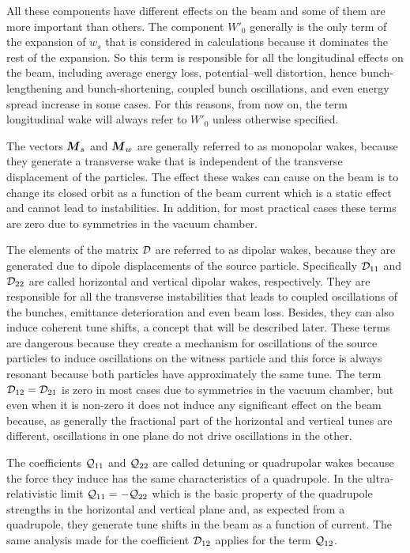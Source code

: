     All these components have different effects on the beam and some of them are more important than others. The component $W'_0$ generally is the only term of the expansion of $w_s$ that is considered in calculations because it dominates the rest of the expansion. So this term is responsible for all the longitudinal effects on the beam, including average energy loss, potential--well distortion, hence bunch-lengthening and bunch-shortening, coupled bunch oscillations, and even energy spread increase in some cases. For this reasons, from now on, the term longitudinal wake will always refer to $W'_0$ unless otherwise specified.

    The vectors $\boldsymbol{M}_s$ and $\boldsymbol{M}_w$ are generally referred to as monopolar wakes, because they generate a transverse wake that is independent of the transverse displacement of the particles. The effect these wakes can cause on the beam is to change its closed orbit as a function of the beam current which is a static effect and cannot lead to instabilities. In addition, for most practical cases these terms are zero due to symmetries in the vacuum chamber.

    The elements of the matrix $\mathcal{D}$ are referred to as dipolar wakes, because they are generated due to dipole displacements of the source particle. Specifically $\mathcal{D}_{11}$ and $\mathcal{D}_{22}$ are called horizontal and vertical dipolar wakes, respectively. They are responsible for all the transverse instabilities that leads to coupled oscillations of the bunches, emittance deterioration and even beam loss. Besides, they can also induce coherent tune shifts, a concept that will be described later. These terms are dangerous because they create a mechanism for oscillations of the source particles to induce oscillations on the witness particle and this force is always resonant because both particles have approximately the same tune. The term $\mathcal{D}_{12}=\mathcal{D}_{21}$ is zero in most cases due to symmetries in the vacuum chamber, but even when it is non-zero it does not induce any significant effect on the beam because, as generally the fractional part of the horizontal and vertical tunes are different, oscillations in one plane do not drive oscillations in the other.

    The coefficients $\mathcal{Q}_{11}$ and $\mathcal{Q}_{22}$ are called detuning or quadrupolar wakes because the force they induce has the same characteristics of a quadrupole. In the ultra-relativistic limit $\mathcal{Q}_{11}=-\mathcal{Q}_{22}$ which is the basic property of the quadrupole strengths in the horizontal and vertical plane and, as expected from a quadrupole, they generate tune shifts in the beam as a function of current. The same analysis made for the coefficient $\mathcal{D}_{12}$ applies for the term $\mathcal{Q}_{12}$.

